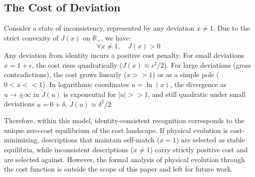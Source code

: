 \documentclass[11pt,a4paper]{article}
\newcommand{\RSExists}{\mathrm{RSExists}}
\newcommand{\Ccfg}{\mathcal{C}}
\begin{document}
\subsection{The Cost of Deviation}
Consider a state of inconsistency, represented by any deviation $x \neq 1$. Due to the strict convexity of $J(x)$ on $\mathbb{R}_+$, we have:
\begin{equation}
    \forall x \neq 1, \quad J(x) > 0
\end{equation}
Any deviation from identity incurs a positive cost penalty. For small deviations $x = 1+\epsilon$, the cost rises quadratically ($J(x) \approx \epsilon^2/2$). For large deviations (gross contradictions), the cost grows linearly ($x>>1$) or as a simple pole ($0<x<<1$). In logarithmic coordinates $u=\ln(x)$, the divergence as $u\rightarrow\pm\infty$ in $\widetilde{J}(u)$ is exponential for $|u|>>1$, and still quadratic under small deviations $u=0+\delta$, $\widetilde{J}(u)\approx\delta^2/2$

Therefore, within this model, identity-consistent recognition corresponds to the unique zero-cost equilibrium of the cost landscape. If physical evolution is cost-minimizing, descriptions that maintain self-match ($x=1$) are selected as stable equilibria, while inconsistent descriptions ($x\neq 1$) carry strictly positive cost and are selected against. However, the formal analysis of physical evolution through the cost function is outside the scope of this paper and left for future work.

\end{document}
